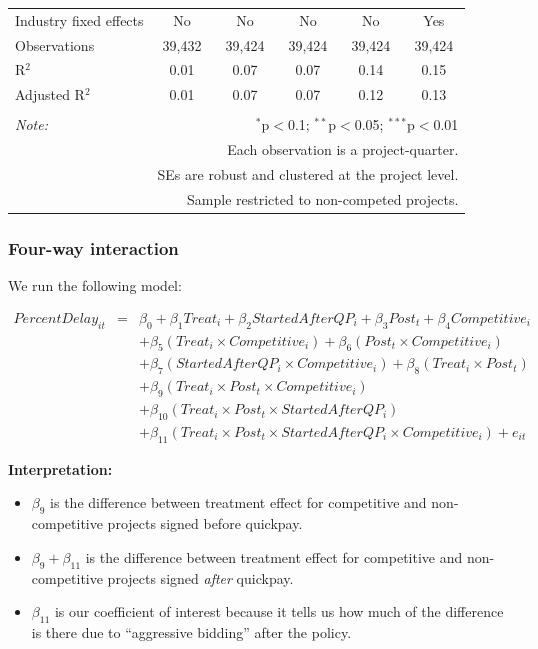 \documentclass[
]{article}
\providecommand{\tightlist}{%
  \setlength{\itemsep}{0pt}\setlength{\parskip}{0pt}}
\begin{document}
\begin{table}[H]
\begin{tabular}{@{\extracolsep{-2pt}}lccccc}
Industry fixed effects & No & No & No & No & Yes \\ 
Observations & 39,432 & 39,424 & 39,424 & 39,424 & 39,424 \\ 
R$^{2}$ & 0.01 & 0.07 & 0.07 & 0.14 & 0.15 \\ 
Adjusted R$^{2}$ & 0.01 & 0.07 & 0.07 & 0.12 & 0.13 \\ 
\hline 
\hline \\[-1.8ex] 
\textit{Note:}  & \multicolumn{5}{r}{$^{*}$p$<$0.1; $^{**}$p$<$0.05; $^{***}$p$<$0.01} \\ 
 & \multicolumn{5}{r}{Each observation is a project-quarter.} \\ 
 & \multicolumn{5}{r}{SEs are robust and clustered at the project level.} \\ 
 & \multicolumn{5}{r}{Sample restricted to non-competed projects.} \\ 
\end{tabular} 
\end{table}

\hypertarget{four-way-interaction}{%
\subsubsection{Four-way interaction}\label{four-way-interaction}}

We run the following model:

\[\begin{aligned} PercentDelay_{it} &=& \beta_0 +\beta_1 Treat_i+ \beta_2 StartedAfterQP_i+ \beta_3 Post_t+ \beta_4 Competitive_i\\ && +  \beta_5 (Treat_i \times Competitive_i) + \beta_6 (Post_t \times Competitive_i)\\ && +  \beta_7 (StartedAfterQP_i \times Competitive_i) +\beta_8 (Treat_i \times Post_t)\\ && + \beta_9 (Treat_i \times Post_t \times Competitive_i) \\ && + \beta_{10} (Treat_i \times Post_t \times StartedAfterQP_i )\\ && + \beta_{11} (Treat_i \times Post_t \times StartedAfterQP_i \times Competitive_i) + e_{it} \end{aligned}\]

\textbf{Interpretation:}

\begin{itemize}
\tightlist
\item
  \(\beta_9\) is the difference between treatment effect for competitive
  and non-competitive projects signed before quickpay.
\item
  \(\beta_9 + \beta_{11}\) is the difference between treatment effect
  for competitive and non-competitive projects signed \emph{after}
  quickpay.
\item
  \(\beta_{11}\) is our coefficient of interest because it tells us how
  much of the difference is there due to ``aggressive bidding'' after
  the policy.
\end{itemize}
\end{document}
